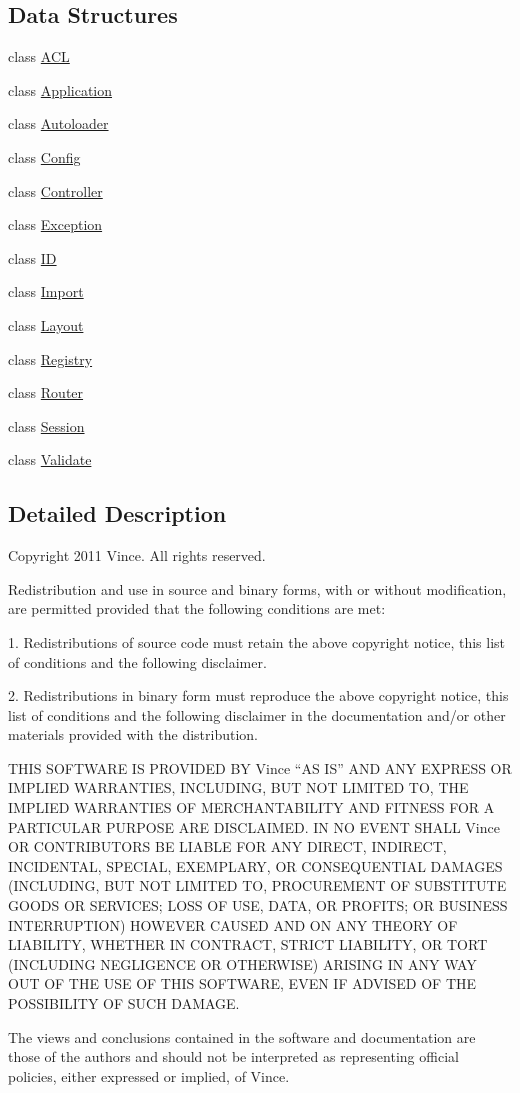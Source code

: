 \subsection*{Data Structures}
\begin{DoxyCompactItemize}
\item 
class \hyperlink{class_anemo_1_1_a_c_l}{ACL}
\item 
class \hyperlink{class_anemo_1_1_application}{Application}
\item 
class \hyperlink{class_anemo_1_1_autoloader}{Autoloader}
\item 
class \hyperlink{class_anemo_1_1_config}{Config}
\item 
class \hyperlink{class_anemo_1_1_controller}{Controller}
\item 
class \hyperlink{class_anemo_1_1_exception}{Exception}
\item 
class \hyperlink{class_anemo_1_1_i_d}{ID}
\item 
class \hyperlink{class_anemo_1_1_import}{Import}
\item 
class \hyperlink{class_anemo_1_1_layout}{Layout}
\item 
class \hyperlink{class_anemo_1_1_registry}{Registry}
\item 
class \hyperlink{class_anemo_1_1_router}{Router}
\item 
class \hyperlink{class_anemo_1_1_session}{Session}
\item 
class \hyperlink{class_anemo_1_1_validate}{Validate}
\end{DoxyCompactItemize}


\subsection{Detailed Description}
Copyright 2011 Vince. All rights reserved.

Redistribution and use in source and binary forms, with or without modification, are permitted provided that the following conditions are met:

1. Redistributions of source code must retain the above copyright notice, this list of conditions and the following disclaimer.

2. Redistributions in binary form must reproduce the above copyright notice, this list of conditions and the following disclaimer in the documentation and/or other materials provided with the distribution.

THIS SOFTWARE IS PROVIDED BY Vince ``AS IS'' AND ANY EXPRESS OR IMPLIED WARRANTIES, INCLUDING, BUT NOT LIMITED TO, THE IMPLIED WARRANTIES OF MERCHANTABILITY AND FITNESS FOR A PARTICULAR PURPOSE ARE DISCLAIMED. IN NO EVENT SHALL Vince OR CONTRIBUTORS BE LIABLE FOR ANY DIRECT, INDIRECT, INCIDENTAL, SPECIAL, EXEMPLARY, OR CONSEQUENTIAL DAMAGES (INCLUDING, BUT NOT LIMITED TO, PROCUREMENT OF SUBSTITUTE GOODS OR SERVICES; LOSS OF USE, DATA, OR PROFITS; OR BUSINESS INTERRUPTION) HOWEVER CAUSED AND ON ANY THEORY OF LIABILITY, WHETHER IN CONTRACT, STRICT LIABILITY, OR TORT (INCLUDING NEGLIGENCE OR OTHERWISE) ARISING IN ANY WAY OUT OF THE USE OF THIS SOFTWARE, EVEN IF ADVISED OF THE POSSIBILITY OF SUCH DAMAGE.

The views and conclusions contained in the software and documentation are those of the authors and should not be interpreted as representing official policies, either expressed or implied, of Vince. 